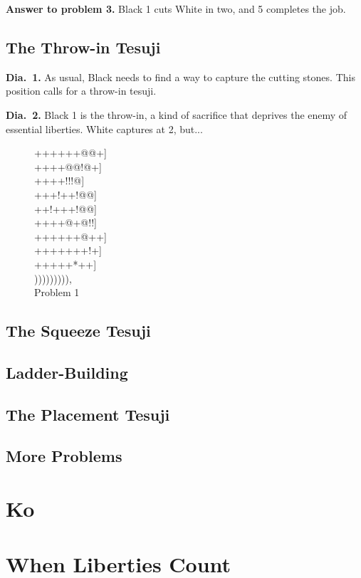 \documentclass[mcrownvopaper,10pt,twopage,onecolumn,final]{memoir}
\begin{document}
\noindent
\textbf{Answer to problem 3.} Black 1 cuts White in two, and 5 completes the
job.

\section{The Throw-in Tesuji}
\noindent
\textbf{Dia.\ 1.} As usual, Black needs to find a way to capture the cutting stones.
This position calls for a throw-in tesuji.

\noindent
\textbf{Dia.\ 2.} Black 1 is the throw-in, a kind of sacrifice that deprives the
enemy of essential liberties. White captures at 2, but...
\begin{figure}[ht]
    \begin{minipage}[c]{0.41\linewidth}
        \centering    
        {\gnos%
        ++++++@@+]\\
        ++++@@!@+]\\
        ++++!!!@]\\
        +++!++!@@]\\
        ++!+++!@@]\\
        ++++@+@!!]\\
        ++++++@++]\\
        +++++++!+]\\
        +++++*++]\\
        ))))))))),\\
        }
        Problem 1
    \end{minipage}
\end{figure}

\section{The Squeeze Tesuji}
\section{Ladder-Building}
\section{The Placement Tesuji}
\section{More Problems}

\chapter{Ko}

\chapter{When Liberties Count}
\end{document}
